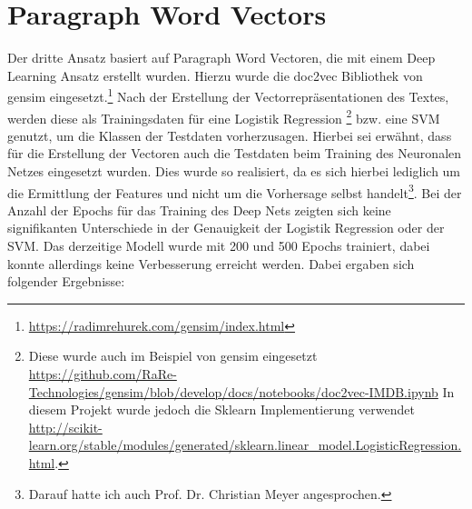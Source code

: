 \documentclass[12pt]{scrartcl}
\begin{document}
    \section{Paragraph Word Vectors}\label{sec:paragraphWordVectors}
    Der dritte Ansatz basiert auf Paragraph Word Vectoren, die mit einem Deep Learning Ansatz erstellt wurden.
    Hierzu wurde die \glqq{}doc2vec\grqq{} Bibliothek von gensim eingesetzt.\footnote{\url{https://radimrehurek.com/gensim/index.html}}
    Nach der Erstellung der Vectorrepräsentationen des Textes, werden diese als Trainingsdaten für eine Logistik Regression
    \footnote{Diese wurde auch im Beispiel von gensim eingesetzt
    \url{https://github.com/RaRe-Technologies/gensim/blob/develop/docs/notebooks/doc2vec-IMDB.ipynb}
    In diesem Projekt wurde jedoch die Sklearn Implementierung verwendet \url{http://scikit-learn.org/stable/modules/generated/sklearn.linear_model.LogisticRegression.html}.}
    bzw. eine SVM genutzt, um die Klassen der Testdaten vorherzusagen.
    Hierbei sei erwähnt, dass für die Erstellung der Vectoren auch die Testdaten beim Training des Neuronalen Netzes eingesetzt wurden.
    Dies wurde so realisiert, da es sich hierbei lediglich um die Ermittlung der Features und nicht um die Vorhersage selbst handelt\footnote{Darauf hatte ich auch Prof. Dr. Christian Meyer angesprochen.}.
    Bei der Anzahl der Epochs für das Training des Deep Nets zeigten sich keine signifikanten Unterschiede in der Genauigkeit der Logistik Regression oder der SVM.
    Das derzeitige Modell wurde mit 200 und 500 Epochs trainiert, dabei konnte allerdings keine Verbesserung erreicht werden.
    \newpage
    Dabei ergaben sich folgender Ergebnisse:
\end{document}
